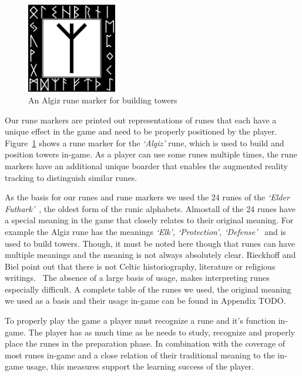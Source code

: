 \begin{figure}
	\centering
	\includegraphics[width=0.35\textwidth]{figures/algiz0.jpeg}
	\caption{\label{fig:rune-marker} An Algiz rune marker for building towers}
\end{figure}

Our rune markers are printed out representations of runes that each have a unique effect in the game and need to be properly positioned by the player. Figure~\ref{fig:rune-marker} shows a rune marker for the \textit{`Algiz'} rune, which is used to build and position towers in-game.
As a player can use some runes multiple times, the rune markers have an additional unique boarder that enables the augmented reality tracking to distinguish similar runes.

As the basis for our runes and rune markers we used the 24 runes of the \textit{`Elder Futhark'}~\cite{elder-futhark}, the oldest form of the runic alphabets.
Almost\footnotemark all of the 24 runes have a special meaning in the game that closely relates to their original meaning.
For example the Algiz rune has the meanings \textit{`Elk', `Protection', `Defense'}~\cite{algiz} and is used to build towers.
Though, it must be noted here though that runes can have multiple meanings and the meaning is not always absolutely clear.
Rieckhoff and Biel point out that there is not Celtic historiography, literature or religious writings.~\cite{rieckhoff-runes} The absence of a large basis of usage, makes interpreting runes especially difficult.
A complete table of the runes we used, the original meaning we used as a basis and their usage in-game can be found in Appendix TODO.

To properly play the game a player must recognize a rune and it's function in-game.
The player has as much time as he needs to study, recognize and properly place the runes in the preparation phase.\footnotemark
In combination with the coverage of most runes in-game and a close relation of their traditional meaning to the in-game usage, this measures support the learning success of the player.

